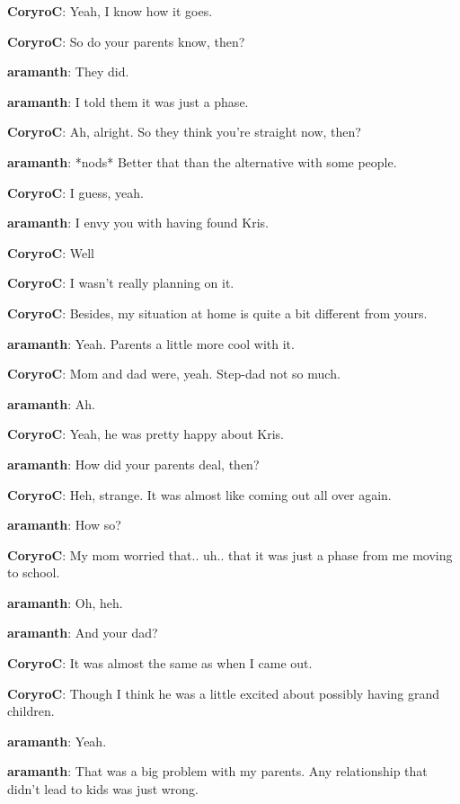 \textbf{\color{blue}CoryroC}: Yeah, I know how it goes.

\textbf{\color{blue}CoryroC}: So do your parents know, then?

\textbf{\color{red}aramanth}: They did.

\textbf{\color{red}aramanth}: I told them it was just a phase.

\textbf{\color{blue}CoryroC}: Ah, alright.  So they think you're straight now, then?

\textbf{\color{red}aramanth}: *nods*  Better that than the alternative with some people.

\textbf{\color{blue}CoryroC}: I guess, yeah.

\textbf{\color{red}aramanth}: I envy you with having found Kris.

\textbf{\color{blue}CoryroC}: Well

\textbf{\color{blue}CoryroC}: I wasn't really planning on it.

\textbf{\color{blue}CoryroC}: Besides, my situation at home is quite a bit different from yours.

\textbf{\color{red}aramanth}: Yeah.  Parents a little more cool with it.

\textbf{\color{blue}CoryroC}: Mom and dad were, yeah.  Step-dad not so much.

\textbf{\color{red}aramanth}: Ah.

\textbf{\color{blue}CoryroC}: Yeah, he was pretty happy about Kris.

\textbf{\color{red}aramanth}: How did your parents deal, then?

\textbf{\color{blue}CoryroC}: Heh, strange.  It was almost like coming out all over again.

\textbf{\color{red}aramanth}: How so?

\textbf{\color{blue}CoryroC}: My mom worried that.. uh.. that it was just a phase from me moving to school.

\textbf{\color{red}aramanth}: Oh, heh.

\textbf{\color{red}aramanth}: And your dad?

\textbf{\color{blue}CoryroC}: It was almost the same as when I came out.

\textbf{\color{blue}CoryroC}: Though I think he was a little excited about possibly having grand children.

\textbf{\color{red}aramanth}: Yeah.

\textbf{\color{red}aramanth}: That was a big problem with my parents.  Any relationship that didn't lead to kids was just wrong.

